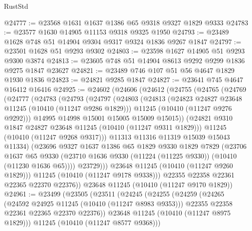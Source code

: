 \begin{lexlean}{RustStd}
\begin{coremodule}
@24777 := @23568 @1631 @1637 @1386 @65 @9318 @9327 @1829 @9333
@24783 := @23577 @1630 @14905 @11153 @9318 @9325 @1950
@24793 := @23489 @1628 @748 @51 @14904 @9304 @9317 @9324 @1836 @9267 @1847
@24797 := @23501 @1628 @51 @9293 @9302
@24803 := @23598 @1627 @14905 @51 @9293 @9300 @3874
@24813 := @23605 @748 @51 @14904 @8613 @9292 @9299 @1836 @9275 @1847 @23627
@24821 := @23489 @746 @107 @51 @56 @4647 @1829 @1930 @1836
@24823 := @24821 @9285 @1847
@24827 := @23641 @745 @4647 @16412 @16416
@24925 := @24602
    (@24606
      (@24612
        (@24755
          (@24765
            (@24769
              (@24777
                (@24783
                  (@24793
                    (@24797
                      (@24803
                        (@24813
                          (@24823 @24827 @23648 @11245 (@10410 (@11247 @9286 @1829)))
                          @11245
                          (@10410 (@11247 @9276 @9292)))
                        @14995
                        @14998
                        @15001
                        @15005
                        @15009
                        @15015))
                    (@24821 @9310 @1847 @24827 @23648 @11245 (@10410 (@11247 @9311 @1829)))
                    @11245
                    (@10410 (@11247 @9268 @9317)))
                  @11313
                  @11316
                  @11319
                  @15039
                  @15043
                  @11334)
                (@23696
                  @9327
                  @1637
                  @1386
                  @65
                  @1829
                  @9330
                  @1829
                  @7829
                  (@23706
                    @1637
                    @65
                    @9330
                    (@23710 @1636 @9330 (@11224 (@11225 @9330)) (@10410 (@11230 @1636 @65))))
                  @23729)))
            @23648
            @11245
            (@10410 (@11247 @9260 @1829)))
          @11245
          (@10410 (@11247 @9178 @9338)))
        @22355
        @22358
        @22361
        @22365
        @22370
        @22376))
    @23648
    @11245
    (@10410 (@11247 @9170 @1829))
@24961 := @23499
    (@23505
      (@23511
        (@24245
          (@24255
            (@24259
              (@24265
                (@24592 @24925 @11245 (@10410 (@11247 @8983 @9353)))
                @22355
                @22358
                @22361
                @22365
                @22370
                @22376))
            @23648
            @11245
            (@10410 (@11247 @8975 @1829)))
          @11245
          (@10410 (@11247 @8577 @9368)))

\end{coremodule}
\end{lexlean}
